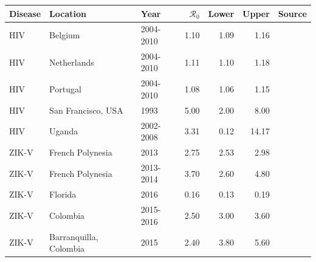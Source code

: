 \message{ !name(draft_v13.tex)}\documentclass[12pt]{article}
\newcommand{\rr}{\ensuremath{\mathcal{R}_0}}
\begin{document}
\begin{landscape}
\begin{table}[H]
\centering
\begin{tabular}{@{}lllrrrl@{}}
\toprule
\textbf{Disease}    & \textbf{Location}                & \textbf{Year}                 & \textbf{$\rr$} & \textbf{Lower} & \textbf{Upper} & \textbf{Source}                                                                                                                  \\ \midrule
HIV                 & Belgium                          & 2004-2010                     & 1.10          & 1.09           & 1.16           & \cite{coelho2011}   \\
HIV                 & Netherlands                      & 2004-2010                     & 1.11        & 1.10            & 1.18           & \cite{coelho2011}    \\
HIV                 & Portugal                         & 2004-2010                     & 1.08        & 1.06           & 1.15           & \cite{coelho2011}   \\
HIV                 & San Francisco, USA               & 1993                          & 5.00           & 2.00              & 8.00              & \cite{blower1994}    \\
HIV                 & Uganda                           & 2002-2008                     & 3.31        & 0.12           & 14.17          & \cite{nsubuga2014}    \\ \hline
ZIK-V                & French Polynesia                 & 2013                          & 2.75        & 2.53           & 2.98           & \cite{zhang2017}        \\
ZIK-V                & French Polynesia                 & 2013-2014                     & 3.70         & 2.60            & 4.80            & \cite{kucharski2016}  \\
ZIK-V                & Florida                          & 2016                          & 0.16        & 0.13           & 0.19           & \cite{dinh2016}       \\
ZIK-V                & Colombia                         & 2015-2016                     & 2.50         & 3.00              & 3.60            & \cite{nishiura2016}    \\
ZIK-V                & Barranquilla, Colombia           & 2015                          & 2.40         & 3.80            & 5.60            & \cite{towers2016}    \\

\end{tabular}
\end{table}
\end{landscape}
\end{document}
